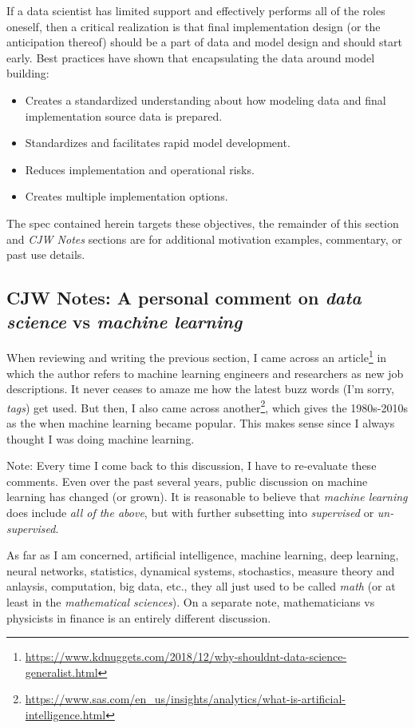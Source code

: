 \documentclass[10pt]{article}
\begin{document}
If a data scientist has limited support and effectively performs all of the roles oneself,
then a critical realization is that final implementation design (or the anticipation thereof) should be a part of data and model
design and should start early.  Best practices have shown that 
encapsulating the data around model building:
\begin{itemize}
\item Creates a standardized understanding about how modeling data and final implementation source
    data is prepared.
\item Standardizes and facilitates rapid model development.
\item Reduces implementation and operational risks.
\item Creates multiple implementation options.
\end{itemize}

The spec contained herein targets these objectives, the remainder of this section and {\em CJW
Notes} sections are for additional motivation examples, commentary, or past use details.

\subsection{CJW Notes: A personal comment on {\em data science} vs {\em machine learning}\label{machinelearning}}

When reviewing and writing the previous section, I came across an article\footnote{
\url{https://www.kdnuggets.com/2018/12/why-shouldnt-data-science-generalist.html}} in which the author  refers to machine learning engineers
and researchers as new job descriptions.  It never ceases to amaze me how the latest buzz words (I'm sorry, {\em tags}) get used.  But then, I
also came across another\footnote{\url{https://www.sas.com/en\_us/insights/analytics/what-is-artificial-intelligence.html}}, which gives the 1980s-2010s as
the when machine learning became popular. This makes sense since I always thought I was doing machine learning.

Note: Every time I come back to this discussion, I have to re-evaluate these comments.  Even over the past several years, public discussion on
machine learning has changed (or grown).  It is reasonable to believe that {\em machine learning} does include {\em all of the above}, but
with further subsetting into {\em supervised} or {\em un-supervised}.

As far as I am concerned, artificial intelligence, machine learning, deep learning, neural networks, statistics, dynamical systems,
stochastics, measure theory and anlaysis, computation, big data, etc., they all just used to be called {\em math} (or at least in the {\em
mathematical sciences}).  On a separate note, mathematicians vs physicists in finance is an entirely different  discussion.
\end{document}
